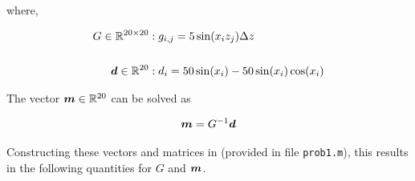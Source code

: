 where,

\begin{align*}
	G \in \mathbb{R}^{20 \times 20} &: g_{i,j} = 5 \sin(x_i z_j) \Delta z \\
	\\
	\boldsymbol{d} \in \mathbb{R}^{20} &: d_i = 50 \sin(x_i) - 50 \sin(x_i) \cos(x_i)
\end{align*}

The vector $\boldsymbol{m} \in \mathbb{R}^{20}$ can be solved as

\begin{align*}
	\boldsymbol{m} = G^{-1} \boldsymbol{d}
\end{align*}

Constructing these vectors and matrices in \MATLAB (provided in file \texttt{prob1.m}), this results in the following quantities for $G$ and $\boldsymbol{m}$.





